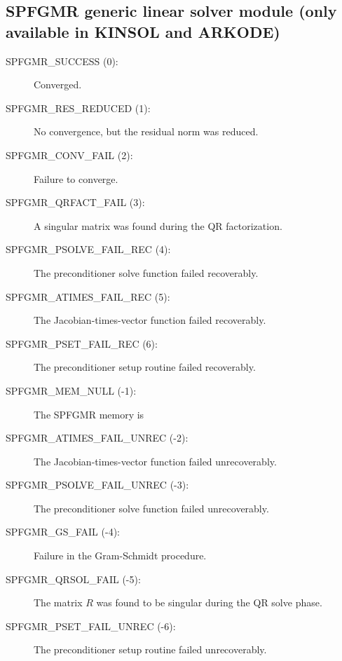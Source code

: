 \documentclass[letterpaper,10pt,english]{sphinxmanual}
\begin{document}
\subsection{SPFGMR generic linear solver module (only available in KINSOL and ARKODE)}
\label{Constants:spfgmr-generic-linear-solver-module-only-available-in-kinsol-and-arkode}\begin{description}
\item[{SPFGMR\_SUCCESS  (0):}] \leavevmode
Converged.

\item[{SPFGMR\_RES\_REDUCED  (1):}] \leavevmode
No convergence, but the residual norm was
reduced.

\item[{SPFGMR\_CONV\_FAIL  (2):}] \leavevmode
Failure to converge.

\item[{SPFGMR\_QRFACT\_FAIL  (3):}] \leavevmode
A singular matrix was found during the
QR factorization.

\item[{SPFGMR\_PSOLVE\_FAIL\_REC  (4):}] \leavevmode
The preconditioner solve function
failed recoverably.

\item[{SPFGMR\_ATIMES\_FAIL\_REC  (5):}] \leavevmode
The Jacobian-times-vector function
failed recoverably.

\item[{SPFGMR\_PSET\_FAIL\_REC  (6):}] \leavevmode
The preconditioner setup routine failed
recoverably.

\item[{SPFGMR\_MEM\_NULL  (-1):}] \leavevmode
The SPFGMR memory is 

\item[{SPFGMR\_ATIMES\_FAIL\_UNREC  (-2):}] \leavevmode
The Jacobian-times-vector function
failed unrecoverably.

\item[{SPFGMR\_PSOLVE\_FAIL\_UNREC  (-3):}] \leavevmode
The preconditioner solve function
failed unrecoverably.

\item[{SPFGMR\_GS\_FAIL  (-4):}] \leavevmode
Failure in the Gram-Schmidt procedure.

\item[{SPFGMR\_QRSOL\_FAIL  (-5):}] \leavevmode
The matrix \(R\) was found to be
singular during the QR solve phase.

\item[{SPFGMR\_PSET\_FAIL\_UNREC  (-6):}] \leavevmode
The preconditioner setup routine
failed unrecoverably.

\end{description}
\end{document}
